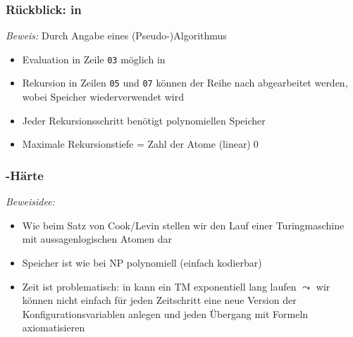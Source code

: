 \documentclass[aspectratio=1610,onlymath]{beamer}
\begin{document}
\begin{frame}\frametitle{Rückblick:  in \PSpace}

\pause

\emph{Beweis:} Durch Angabe eines (Pseudo-)Algorithmus

\smallskip

\begin{itemize}
\item Evaluation in Zeile \texttt{03} möglich in \PSpace
\item Rekursion in Zeilen \texttt{05} und \texttt{07} können der Reihe nach abgearbeitet werden, wobei Speicher wiederverwendet wird
\item Jeder Rekursionsschritt benötigt polynomiellen Speicher
\item Maximale Rekursionstiefe = Zahl der Atome (linear)\qed
\end{itemize}


\end{frame}

\begin{frame}\frametitle{\PSpace-Härte}

\bigskip\pause

\pause

\emph{Beweisidee:}
\begin{itemize}
\item Wie beim Satz von Cook/Levin stellen wir den Lauf einer Turingmaschine
mit aussagenlogischen Atomen dar
\item Speicher ist wie bei NP polynomiell (einfach kodierbar)
\item Zeit ist problematisch: in \PSpace kann ein TM exponentiell lang laufen
$\leadsto$ wir können nicht einfach für jeden Zeitschritt eine neue Version
der Konfigurationsvariablen anlegen und jeden Übergang mit Formeln axiomatisieren
\end{itemize}

\end{frame}
\end{document}
